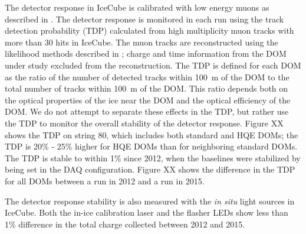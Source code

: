 The detector response in IceCube is calibrated with low energy muons as
described in \cite{IC3:ereco}. The detector response is monitored in each run using the track
detection probability (TDP) calculated from high
multiplicity muon tracks with more than 30 hits in IceCube. The muon
tracks are reconstructed using the likelihood methods described in
\cite{IC3:ereco}; charge and time information from the DOM under study excluded
from the reconstruction. The TDP is
defined for each DOM as the ratio of the number of detected tracks
within 100~m of the DOM to the total number of tracks within 100~m of
the DOM. This ratio depends both on the optical properties of the ice
near the DOM and the optical efficiency of the DOM. We do not attempt
to separate
these effects in the TDP, but rather use the TDP to monitor the
overall stability of the detector response. Figure XX shows the TDP on
string 80, which includes both standard and HQE DOMs; the TDP is
20\% - 25\% higher for HQE DOMs than for neighboring standard
DOMs. The TDP is stable to within 1\% since 2012, when the baselines
were stabilized by being set in the DAQ configuration. Figure XX shows
the difference in the TDP for all DOMs between a run in 2012 and a run
in 2015.

The detector response stability is also measured with the {\it in
  situ} light sources in IceCube. Both the in-ice calibration laser
\cite{IC3:SC} and the flasher LEDs show less than 1\% difference in the total
charge collected between 2012 and 2015. 

%
%








